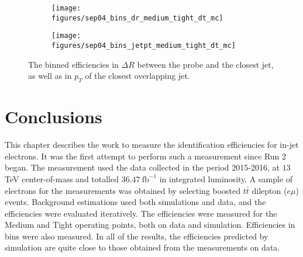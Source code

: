 \begin{figure}
	\begin{subfigure}{0.5\textwidth}
		\texttt{[image: figures/sep04\_bins\_dr\_medium\_tight\_dt\_mc]}
	\end{subfigure}
	\begin{subfigure}{0.5\textwidth}
		\texttt{[image: figures/sep04\_bins\_jetpt\_medium\_tight\_dt\_mc]}
	\end{subfigure}

	\centering
	\caption{The binned efficiencies in $\Delta R$ between the probe and the closest jet,
		as well as in $p_T$ of the closest overlapping jet.}
	\label{f:binspt02}
\end{figure}


\section{Conclusions}\label{s:eidcon}

This chapter describes the work to measure the identification efficiencies for
in-jet electrons. It was the first attempt to perform such a measurement since
Run 2 began. The measurement used the data collected in the period 2015-2016,
at $13$ TeV center-of-mass and totalled $36.47~\text{fb}^{-1}$ in integrated
luminosity. A sample of electrons for the measurements was obtained by
selecting boosted $t\bar{t}$ dilepton ($e\mu$) events. Background estimations
used both simulations and data, and the efficiencies were evaluated
iteratively. The efficiencies were measured for the Medium and Tight operating
points, both on data and simulation. Efficiencies in bins were also measured.
In all of the results, the efficiencies predicted by simulation are quite close
to those obtained from the measurements on data.



